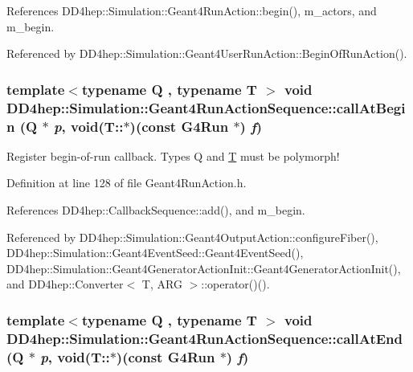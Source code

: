 References DD4hep::Simulation::Geant4RunAction::begin(), m\_\-actors, and m\_\-begin.

Referenced by DD4hep::Simulation::Geant4UserRunAction::BeginOfRunAction().\hypertarget{class_d_d4hep_1_1_simulation_1_1_geant4_run_action_sequence_a45da17c9f91b5448ce77b99cd44db369}{
\subsubsection[{callAtBegin}]{\setlength{\rightskip}{0pt plus 5cm}template$<$typename Q , typename T $>$ void DD4hep::Simulation::Geant4RunActionSequence::callAtBegin (Q $\ast$ {\em p}, \/  void(T::$\ast$)(const G4Run $\ast$) {\em f})}}
\label{class_d_d4hep_1_1_simulation_1_1_geant4_run_action_sequence_a45da17c9f91b5448ce77b99cd44db369}


Register begin-\/of-\/run callback. Types Q and \hyperlink{class_t}{T} must be polymorph! 

Definition at line 128 of file Geant4RunAction.h.

References DD4hep::CallbackSequence::add(), and m\_\-begin.

Referenced by DD4hep::Simulation::Geant4OutputAction::configureFiber(), DD4hep::Simulation::Geant4EventSeed::Geant4EventSeed(), DD4hep::Simulation::Geant4GeneratorActionInit::Geant4GeneratorActionInit(), and DD4hep::Converter$<$ T, ARG $>$::operator()().\hypertarget{class_d_d4hep_1_1_simulation_1_1_geant4_run_action_sequence_aeaecc7d36c3d746ccc4902c86c60e3da}{
\subsubsection[{callAtEnd}]{\setlength{\rightskip}{0pt plus 5cm}template$<$typename Q , typename T $>$ void DD4hep::Simulation::Geant4RunActionSequence::callAtEnd (Q $\ast$ {\em p}, \/  void(T::$\ast$)(const G4Run $\ast$) {\em f})}}
\label{class_d_d4hep_1_1_simulation_1_1_geant4_run_action_sequence_aeaecc7d36c3d746ccc4902c86c60e3da}


